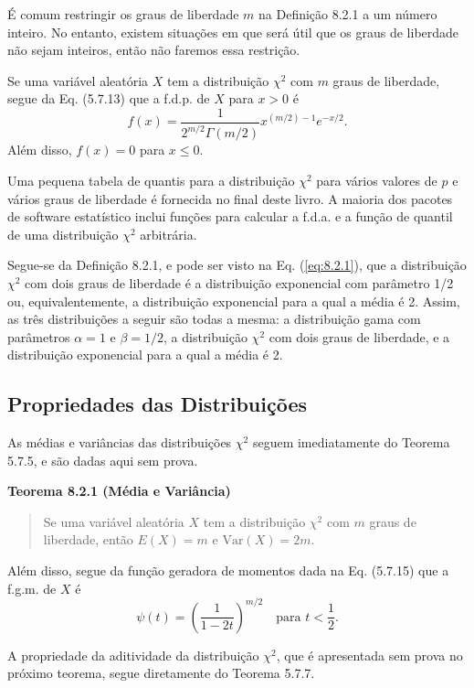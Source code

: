 É comum restringir os graus de liberdade $m$ na Definição 8.2.1 a um número inteiro. No entanto, existem situações em que será útil que os graus de liberdade não sejam inteiros, então não faremos essa restrição.

Se uma variável aleatória $X$ tem a distribuição $\chi^2$ com $m$ graus de liberdade, segue da Eq. (5.7.13) que a f.d.p. de $X$ para $x>0$ é
\begin{equation} \label{eq:8.2.1}
    f(x) = \frac{1}{2^{m/2}\Gamma(m/2)} x^{(m/2)-1}e^{-x/2}.
\end{equation}
Além disso, $f(x)=0$ para $x \le 0$.

Uma pequena tabela de quantis para a distribuição $\chi^2$ para vários valores de $p$ e vários graus de liberdade é fornecida no final deste livro. A maioria dos pacotes de software estatístico inclui funções para calcular a f.d.a. e a função de quantil de uma distribuição $\chi^2$ arbitrária.

Segue-se da Definição 8.2.1, e pode ser visto na Eq. (\ref{eq:8.2.1}), que a distribuição $\chi^2$ com dois graus de liberdade é a distribuição exponencial com parâmetro 1/2 ou, equivalentemente, a distribuição exponencial para a qual a média é 2. Assim, as três distribuições a seguir são todas a mesma: a distribuição gama com parâmetros $\alpha=1$ e $\beta=1/2$, a distribuição $\chi^2$ com dois graus de liberdade, e a distribuição exponencial para a qual a média é 2.

\subsection*{Propriedades das Distribuições}

As médias e variâncias das distribuições $\chi^2$ seguem imediatamente do Teorema 5.7.5, e são dadas aqui sem prova.

\vspace{1em}
\noindent\textbf{Teorema 8.2.1 (Média e Variância)}
\begin{quote}
    Se uma variável aleatória $X$ tem a distribuição $\chi^2$ com $m$ graus de liberdade, então $E(X)=m$ e $\text{Var}(X)=2m$.
\end{quote}
\vspace{1em}

Além disso, segue da função geradora de momentos dada na Eq. (5.7.15) que a f.g.m. de $X$ é
$$
\psi(t) = \left(\frac{1}{1-2t}\right)^{m/2} \quad \text{para } t < \frac{1}{2}.
$$

A propriedade da aditividade da distribuição $\chi^2$, que é apresentada sem prova no próximo teorema, segue diretamente do Teorema 5.7.7.


